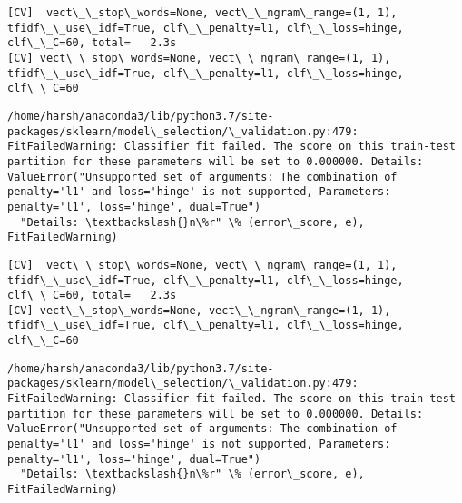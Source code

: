 \documentclass[11pt]{article}
\begin{document}
    \begin{Verbatim}[commandchars=\\\{\}]
[CV]  vect\_\_stop\_words=None, vect\_\_ngram\_range=(1, 1), tfidf\_\_use\_idf=True, clf\_\_penalty=l1, clf\_\_loss=hinge, clf\_\_C=60, total=   2.3s
[CV] vect\_\_stop\_words=None, vect\_\_ngram\_range=(1, 1), tfidf\_\_use\_idf=True, clf\_\_penalty=l1, clf\_\_loss=hinge, clf\_\_C=60 

    \end{Verbatim}

    \begin{Verbatim}[commandchars=\\\{\}]
/home/harsh/anaconda3/lib/python3.7/site-packages/sklearn/model\_selection/\_validation.py:479: FitFailedWarning: Classifier fit failed. The score on this train-test partition for these parameters will be set to 0.000000. Details: 
ValueError("Unsupported set of arguments: The combination of penalty='l1' and loss='hinge' is not supported, Parameters: penalty='l1', loss='hinge', dual=True")
  "Details: \textbackslash{}n\%r" \% (error\_score, e), FitFailedWarning)

    \end{Verbatim}

    \begin{Verbatim}[commandchars=\\\{\}]
[CV]  vect\_\_stop\_words=None, vect\_\_ngram\_range=(1, 1), tfidf\_\_use\_idf=True, clf\_\_penalty=l1, clf\_\_loss=hinge, clf\_\_C=60, total=   2.3s
[CV] vect\_\_stop\_words=None, vect\_\_ngram\_range=(1, 1), tfidf\_\_use\_idf=True, clf\_\_penalty=l1, clf\_\_loss=hinge, clf\_\_C=60 

    \end{Verbatim}

    \begin{Verbatim}[commandchars=\\\{\}]
/home/harsh/anaconda3/lib/python3.7/site-packages/sklearn/model\_selection/\_validation.py:479: FitFailedWarning: Classifier fit failed. The score on this train-test partition for these parameters will be set to 0.000000. Details: 
ValueError("Unsupported set of arguments: The combination of penalty='l1' and loss='hinge' is not supported, Parameters: penalty='l1', loss='hinge', dual=True")
  "Details: \textbackslash{}n\%r" \% (error\_score, e), FitFailedWarning)

    \end{Verbatim}
\end{document}
